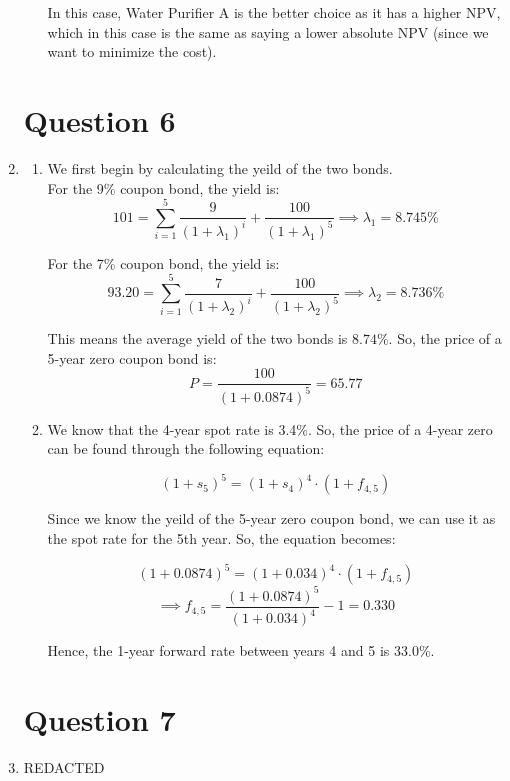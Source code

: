 \documentclass[a4paper]{article}
\begin{document}
\begin{enumerate}
\begin{enumerate}
        In this case, Water Purifier A is the better choice as it has a higher NPV, which in this case is the same as saying a lower absolute NPV (since we want to minimize the cost).
    \end{enumerate}


    \vspace{15mm}
    \section*{Question 6}
    \item \begin{enumerate}
        \item We first begin by calculating the yeild of the two bonds. \\

        For the 9\% coupon bond, the yield is:
        \[ 101 = \sum_{i=1}^{5}{\frac{9}{(1 + \lambda_1)^i}} + \frac{100}{(1 + \lambda_1)^5} \implies \lambda_1 = 8.745\% \]

        For the 7\% coupon bond, the yield is:
        \[ 93.20 = \sum_{i=1}^{5}{\frac{7}{(1 + \lambda_2)^i}} + \frac{100}{(1 + \lambda_2)^5} \implies \lambda_2 = 8.736\% \]

        This means the average yield of the two bonds is $8.74\%$. So, the price of a 5-year zero coupon bond is:
        \[ P = \frac{100}{(1 + 0.0874)^5} = 65.77 \]


        \newpage
        \item We know that the 4-year spot rate is 3.4\%. So, the price of a 4-year zero can be found through the following equation:

        \[ (1 + s_5)^5 = (1 + s_4)^4 \cdot (1 + f_{4,5}) \]

        Since we know the yeild of the 5-year zero coupon bond, we can use it as the spot rate for the 5th year. So, the equation becomes:

        \[ (1 + 0.0874)^5 = (1 + 0.034)^4 \cdot (1 + f_{4,5}) \]
        \[ \implies f_{4, 5} = \frac{(1 + 0.0874)^5}{(1 + 0.034)^4} - 1 = 0.330 \]

        Hence, the 1-year forward rate between years 4 and 5 is 33.0\%.
    \end{enumerate}

    \vspace*{15mm}
    \section*{Question 7}
    \item REDACTED



\end{enumerate}
\end{document}
